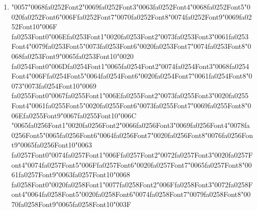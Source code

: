 \documentclass[12pt]{article}
\begin{document}
\begin{enumerate}[label=Q\arabic*.]
 \item {\char"0057}{\char"0068}{\csname fa0252Font2\endcsname\char"0069}{\csname fa0252Font3\endcsname\char"0063}{\csname fa0252Font4\endcsname\char"0068}{\csname fa0252Font5\endcsname\char"0020}{\csname fa0252Font6\endcsname\char"006F}{\csname fa0252Font7\endcsname\char"0070}{\csname fa0252Font8\endcsname\char"0074}{\csname fa0252Font9\endcsname\char"0069}{\csname fa0252Font10\endcsname\char"006F} {\csname fa0253Font0\endcsname\char"006E}{\csname fa0253Font1\endcsname\char"0020}{\csname fa0253Font2\endcsname\char"0073}{\csname fa0253Font3\endcsname\char"0061}{\csname fa0253Font4\endcsname\char"0079}{\csname fa0253Font5\endcsname\char"0073}{\csname fa0253Font6\endcsname\char"0020}{\csname fa0253Font7\endcsname\char"0074}{\csname fa0253Font8\endcsname\char"0068}{\csname fa0253Font9\endcsname\char"0065}{\csname fa0253Font10\endcsname\char"0020} {\csname fa0254Font0\endcsname\char"006D}{\csname fa0254Font1\endcsname\char"0065}{\csname fa0254Font2\endcsname\char"0074}{\csname fa0254Font3\endcsname\char"0068}{\csname fa0254Font4\endcsname\char"006F}{\csname fa0254Font5\endcsname\char"0064}{\csname fa0254Font6\endcsname\char"0020}{\csname fa0254Font7\endcsname\char"0061}{\csname fa0254Font8\endcsname\char"0073}{\char"0073}{\csname fa0254Font10\endcsname\char"0069} {\csname fa0255Font0\endcsname\char"0067}{\csname fa0255Font1\endcsname\char"006E}{\csname fa0255Font2\endcsname\char"0073}{\csname fa0255Font3\endcsname\char"0020}{\csname fa0255Font4\endcsname\char"0061}{\csname fa0255Font5\endcsname\char"0020}{\csname fa0255Font6\endcsname\char"0073}{\csname fa0255Font7\endcsname\char"0069}{\csname fa0255Font8\endcsname\char"006E}{\csname fa0255Font9\endcsname\char"0067}{\csname fa0255Font10\endcsname\char"006C} {\char"0065}{\csname fa0256Font1\endcsname\char"0020}{\csname fa0256Font2\endcsname\char"0066}{\csname fa0256Font3\endcsname\char"0069}{\csname fa0256Font4\endcsname\char"0078}{\csname fa0256Font5\endcsname\char"0065}{\csname fa0256Font6\endcsname\char"0064}{\csname fa0256Font7\endcsname\char"0020}{\csname fa0256Font8\endcsname\char"0076}{\csname fa0256Font9\endcsname\char"0065}{\csname fa0256Font10\endcsname\char"0063} {\csname fa0257Font0\endcsname\char"0074}{\csname fa0257Font1\endcsname\char"006F}{\csname fa0257Font2\endcsname\char"0072}{\csname fa0257Font3\endcsname\char"0020}{\csname fa0257Font4\endcsname\char"0074}{\csname fa0257Font5\endcsname\char"006F}{\csname fa0257Font6\endcsname\char"0020}{\csname fa0257Font7\endcsname\char"0065}{\csname fa0257Font8\endcsname\char"0061}{\csname fa0257Font9\endcsname\char"0063}{\csname fa0257Font10\endcsname\char"0068} {\csname fa0258Font0\endcsname\char"0020}{\csname fa0258Font1\endcsname\char"0077}{\csname fa0258Font2\endcsname\char"006F}{\csname fa0258Font3\endcsname\char"0072}{\csname fa0258Font4\endcsname\char"0064}{\csname fa0258Font5\endcsname\char"0020}{\csname fa0258Font6\endcsname\char"0074}{\csname fa0258Font7\endcsname\char"0079}{\csname fa0258Font8\endcsname\char"0070}{\csname fa0258Font9\endcsname\char"0065}{\csname fa0258Font10\endcsname\char"003F}

\end{enumerate}
\end{document}

